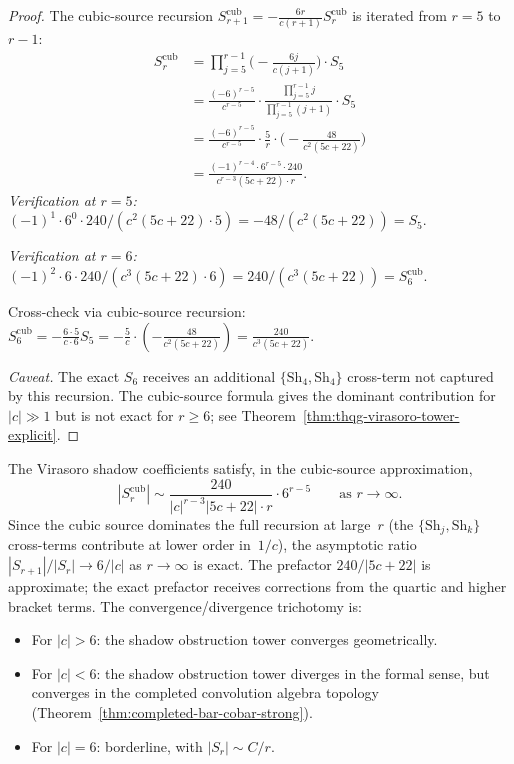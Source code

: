 \begin{proof}
The cubic-source recursion
$S_{r+1}^{\mathrm{cub}} = -\frac{6r}{c(r+1)}S_r^{\mathrm{cub}}$
is iterated from $r = 5$ to $r - 1$:
\begin{align*}
S_r^{\mathrm{cub}} &= \prod_{j=5}^{r-1}\bigl(-\frac{6j}{c(j+1)}\bigr)
 \cdot S_5 \\
&= \frac{(-6)^{r-5}}{c^{r-5}}
 \cdot \frac{\prod_{j=5}^{r-1} j}{\prod_{j=5}^{r-1}(j+1)}
 \cdot S_5 \\
&= \frac{(-6)^{r-5}}{c^{r-5}}
 \cdot \frac{5}{r}
 \cdot \bigl(-\frac{48}{c^2(5c+22)}\bigr) \\
&= \frac{(-1)^{r-4} \cdot 6^{r-5} \cdot 240}
 {c^{r-3}(5c+22) \cdot r}.
\end{align*}
\emph{Verification at $r = 5$:}
$(-1)^1 \cdot 6^0 \cdot 240 / (c^2(5c+22) \cdot 5)
= -48/(c^2(5c+22)) = S_5$. \checkmark

\emph{Verification at $r = 6$:}
$(-1)^2 \cdot 6 \cdot 240 / (c^3(5c+22) \cdot 6)
= 240/(c^3(5c+22)) = S_6^{\mathrm{cub}}$. \checkmark

Cross-check via cubic-source recursion:
$S_6^{\mathrm{cub}} = -\frac{6 \cdot 5}{c \cdot 6} S_5
= -\frac{5}{c} \cdot (-\frac{48}{c^2(5c+22)})
= \frac{240}{c^3(5c+22)}$. \checkmark

\smallskip
\noindent\textit{Caveat.}
The exact $S_6$ receives an additional
$\{\mathrm{Sh}_4, \mathrm{Sh}_4\}$ cross-term not captured
by this recursion. The cubic-source formula gives the
dominant contribution for $|c| \gg 1$ but is not exact for
$r \geq 6$; see
Theorem~\ref{thm:thqg-virasoro-tower-explicit}.
\end{proof}

\begin{corollary}
\label{cor:shadow-asymptotic-decay}
The Virasoro shadow coefficients satisfy, in the
cubic-source approximation,
\begin{equation}\label{eq:shadow-asymptotic}
|S_r^{\mathrm{cub}}| \sim \frac{240}{|c|^{r-3}|5c+22| \cdot r}
\cdot 6^{r-5}
\qquad \text{as } r \to \infty.
\end{equation}
Since the cubic source dominates the full recursion at
large~$r$ (the $\{\mathrm{Sh}_j, \mathrm{Sh}_k\}$
cross-terms contribute at lower order in~$1/c$),
the asymptotic ratio $|S_{r+1}|/|S_r| \to 6/|c|$ as
$r \to \infty$ is exact. The prefactor
$240/|5c+22|$ is approximate; the exact prefactor receives
corrections from the quartic and higher bracket terms.
The convergence/divergence trichotomy is:
\begin{itemize}
\item For $|c| > 6$: the shadow obstruction tower converges
 geometrically.
\item For $|c| < 6$: the shadow obstruction tower diverges in
 the formal sense, but converges in the completed
 convolution algebra topology
 (Theorem~\ref{thm:completed-bar-cobar-strong}).
\item For $|c| = 6$: borderline, with $|S_r| \sim C/r$.
\end{itemize}
\end{corollary}

